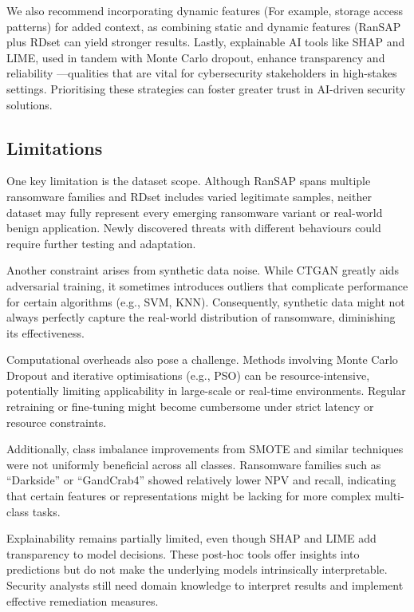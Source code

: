 We also recommend incorporating dynamic features (For example, storage access patterns) for added context, as combining static and dynamic features (RanSAP plus RDset  can yield stronger results. Lastly, explainable AI tools like SHAP and LIME, used in  tandem with Monte Carlo dropout, enhance transparency and reliability —qualities that are vital for cybersecurity stakeholders in high-stakes  settings. Prioritising these strategies can foster greater trust in AI-driven security solutions.

\subsection{ Limitations}

One key limitation is the dataset scope. Although RanSAP spans multiple ransomware families and RDset includes varied legitimate samples, neither dataset may fully represent every emerging ransomware variant or real-world benign application. Newly discovered threats with different behaviours could require further testing and adaptation.

Another constraint arises from synthetic data noise. While CTGAN greatly aids adversarial training, it sometimes introduces outliers that complicate performance for certain algorithms (e.g., SVM, KNN). Consequently, synthetic data might not always perfectly capture the real-world distribution of ransomware, diminishing its effectiveness.

 Computational overheads also pose a challenge. Methods involving Monte Carlo Dropout and iterative optimisations (e.g., PSO) can be resource-intensive, potentially limiting applicability in large-scale or real-time environments. Regular retraining or fine-tuning might become cumbersome under strict latency or resource constraints.

 Additionally, class imbalance improvements from SMOTE and similar techniques were not uniformly beneficial across all classes. Ransomware families such as “Darkside” or “GandCrab4” showed relatively lower NPV and recall, indicating that certain features or representations might be lacking for more complex multi-class tasks.

 Explainability remains partially limited, even though SHAP and LIME add transparency to model decisions. These post-hoc tools offer insights into predictions but do not make the underlying models intrinsically interpretable. Security analysts still need domain knowledge to interpret results and implement effective remediation measures.


